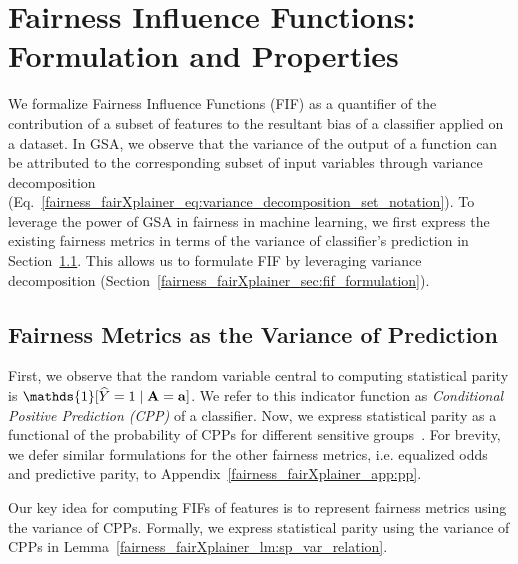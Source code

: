 \section{Fairness Influence Functions: Formulation and Properties}\label{fairness_fairXplainer_sec:fifs}
We formalize Fairness Influence Functions (FIF) as a quantifier of the contribution of a subset of features to the resultant bias of a classifier applied on a dataset.  In GSA, we observe that the variance of the output of a function can be attributed to the corresponding subset of input variables through variance decomposition (Eq.~\eqref{fairness_fairXplainer_eq:variance_decomposition_set_notation}). To leverage the power of GSA in fairness in machine learning, we first express the existing fairness metrics in terms of the variance of classifier's prediction in Section~\ref{fairness_fairXplainer_sec:metric_as_variance}. This allows us to formulate FIF by leveraging variance decomposition (Section~\ref{fairness_fairXplainer_sec:fif_formulation}). 


\subsection{Fairness Metrics as the Variance of Prediction}
\label{fairness_fairXplainer_sec:metric_as_variance}

First, we observe that the random variable central to computing statistical parity is $ \mathds{1}[\widehat{Y} = 1 \mid \sensitive = \mathbf{a}] $.
We refer to this indicator function as \textit{Conditional Positive Prediction (CPP)} of a classifier. Now, we express statistical parity as a functional of the probability of CPPs for different sensitive groups~\cite{benesse2021fairness}. For brevity, we defer similar formulations for the other fairness metrics, i.e. equalized odds and predictive parity, to Appendix~\ref{fairness_fairXplainer_app:pp}. %

Our key idea for computing FIFs of features is to represent fairness metrics using the variance of CPPs. Formally, we express statistical parity using the variance of CPPs in Lemma~\ref{fairness_fairXplainer_lm:sp_var_relation}.

